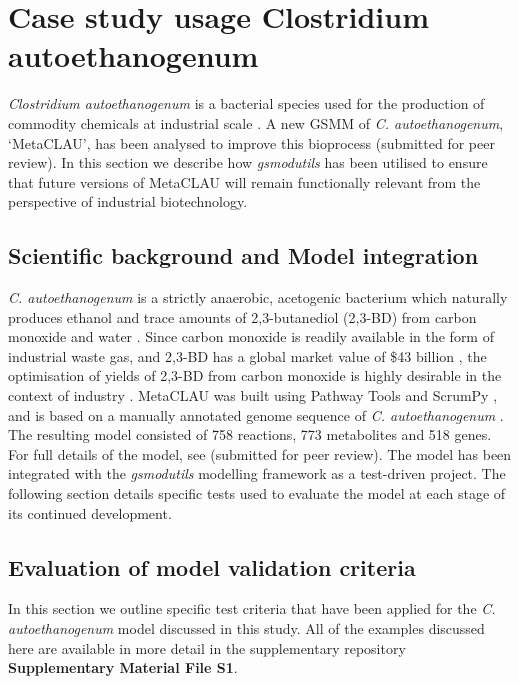 \documentclass[journal=asbcd6]{achemso}
\begin{document}
\section{Case study usage Clostridium autoethanogenum}

\textit{Clostridium autoethanogenum} is a bacterial species used for the production of commodity chemicals at industrial scale \cite{abrini1994clostridium,norman2018progress}. A new GSMM of \textit{C. autoethanogenum}, `MetaCLAU', has been analysed to improve this bioprocess \cite{norman2018agenome} (submitted for peer review).
In this section we describe how \textit{gsmodutils} has been utilised to ensure that future versions of MetaCLAU will remain functionally relevant from the perspective of industrial biotechnology.

\subsection{Scientific background and Model integration}

\textit{C. autoethanogenum} is a strictly anaerobic, acetogenic bacterium which naturally produces ethanol and trace amounts of 2,3-butanediol (2,3-BD) from carbon monoxide and water \cite{abrini1994clostridium,schuchmann2014autotrophy,norman2018progress}. Since carbon monoxide is readily available in the form of industrial waste gas, and 2,3-BD has a global market value of \$43 billion \cite{kopke201123butanediol}, the optimisation of yields of 2,3-BD from carbon monoxide is highly desirable in the context of industry \cite{norman2018progress}.   
MetaCLAU was built using Pathway Tools \cite{karp2002pathway} and ScrumPy \cite{poolman2006scrumpy}, and is based on a manually annotated genome sequence of \textit{C. autoethanogenum} \cite{humphreys2015whole}. The resulting model consisted of 758 reactions, 773 metabolites and 518 genes. For full details of the model, see \cite{norman2018agenome} (submitted for peer review).
The model has been integrated with the \textit{gsmodutils} modelling framework as a test-driven project. 
The following section details specific tests used to evaluate the model at each stage of its continued development.

\subsection{Evaluation of model validation criteria}
In this section we outline specific test criteria that have been applied for the \textit{C. autoethanogenum} model discussed in this study.
All of the examples discussed here are available in more detail in the supplementary repository \textbf{Supplementary Material File S1}.
\end{document}

